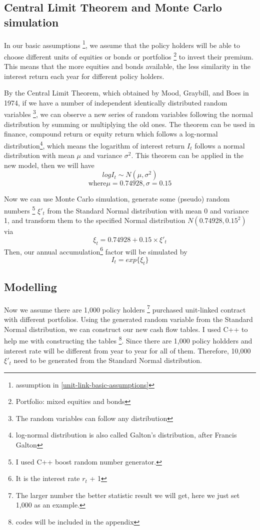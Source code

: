 \documentclass{report}
\begin{document}
{\subsection{Central Limit Theorem and Monte Carlo simulation}

In our basic assumptions \footnote{assumption in \ref{unit-link-basic-assumptions}}, we assume that the policy holders will be able to choose different units of equities or bonds or portfolios \footnote{Portfolio: mixed equities and bonds} to invest their premium. This means that the more equities and bonds available, the less similarity in the interest return each year for different policy holders. 

By \cite{bib:CLT}the Central Limit Theorem, which obtained by Mood, Graybill, and Boes in 1974, if we have a number of independent identically distributed random variables \footnote{The random variables can follow any distribution}, we can observe a new series of random variables following the normal distribution by summing or multiplying the old ones. The theorem can be used in finance, compound return or equity return which follows a log-normal distribution\footnote{log-normal distribution is also called Galton's distribution, after Francis Galton}, which means the logarithm of interest return $I_t$ follows a normal distribution with mean $\mu$ and variance $\sigma^2$. This theorem can be applied in the new model, then we will have
\[
logI_t  \sim N(\mu,\sigma^2)
\]
\[
\text{where}   \mu= 0.74928, \sigma= 0.15 
\]

Now we can use Monte Carlo simulation\cite{bib:MCS}, generate some (pseudo) random numbers \footnote{I used C++ boost random number generator.} $\xi'_t$ from the Standard Normal distribution with mean 0 and variance 1, and transform them to the specified Normal distribution $N(0.74928,0.15^2)$ via   
\[
\xi_t = 0.74928 + 0.15\times \xi'_t
\]
Then, our annual accumulation\footnote{It is the interest rate $r_t$ + 1} factor will be simulated by 
\[
I_t=exp\{\xi_t\} 
\]



\subsection{Modelling}

Now we assume there are 1,000 policy holders \footnote{The larger number the better statistic result we will get, here we just set 1,000 as an example.} purchased unit-linked contract with different portfolios. Using the generated random variable from the Standard Normal distribution, we can construct our new cash flow tables. I used C++ to help me with constructing the tables \footnote{codes will be included in the appendix}. Since there are 1,000 policy holdders and interest rate will be different from year to year for all of them. Therefore, 10,000  $\xi'_t$ need to be generated from the Standard Normal distribution.


}
\end{document}
